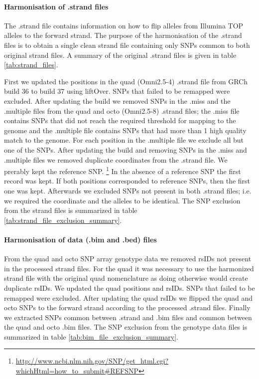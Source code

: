 \paragraph{Harmonisation of .strand files}
The .strand file contains information on how to flip alleles from Illumina TOP alleles to the forward strand. The purpose of the harmonisation of the .strand files is to obtain a single clean strand file containing only SNPs common to both original strand files. A summary of the original .strand files is given in table \ref{tab:strand_files}.


First we updated the positions in the quad (Omni2.5-4) .strand file from \gls{GRCh}\cite{10.1371/journal.pbio.1001091} build 36 to build 37 using liftOver.\cite{Karolchik01012014} SNPs that failed to be remapped were excluded. After updating the build we removed \glspl{SNP} in the .miss and the .multiple files from the quad and octo (Omni2.5-8) .strand files; the .miss file contains \glspl{SNP} that did not reach the required threshold for mapping to the genome and the .multiple file contains \glspl{SNP} that had more than 1 high quality match to the genome. For each position in the .multiple file we exclude all but one of the \glspl{SNP}.
After updating the build and removing \glspl{SNP} in the .miss and .multiple files we removed duplicate coordinates from the .strand file. We prerably kept the reference \gls{SNP}.
\footnote{\url{http://www.ncbi.nlm.nih.gov/SNP/get_html.cgi?whichHtml=how_to_submit\#REFSNP}} In the absence of a reference SNP the first record was kept. If both positions corresponded to reference SNPs, then the first one was kept.
Afterwards we excluded \glspl{SNP} not present in both .strand files; i.e. we required the coordinate and the alleles to be identical. The SNP exclusion from the strand files is summarized in table \ref{tab:strand_file_exclusion_summary}.


\paragraph{Harmonisation of data (.bim and .bed) files}
From the quad and octo \gls{SNP} array genotype data we removed rsIDs not present in the processed strand files. For the quad it was necessary to use the harmonized strand file with the original quad nomenclature as doing otherwise would create duplicate rsIDs. We updated the quad positions and rsIDs. SNPs that failed to be remapped were excluded. After updating the quad rsIDs we flipped the quad and octo \glspl{SNP} to the forward strand according to the processed .strand files. Finally we extracted \glspl{SNP} common between .strand and .bim files and common between the quad and octo .bim files. The SNP exclusion from the genotype data files is summarized in table \ref{tab:bim_file_exclusion_summary}.


